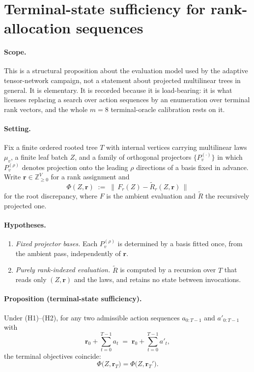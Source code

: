 \section*{Terminal-state sufficiency for rank-allocation sequences}
\label{sec:terminal-state-sufficiency}

\paragraph{Scope.}
This is a structural proposition about the evaluation model used by the
adaptive tensor-network campaign, not a statement about projected multilinear
trees in general. It is elementary. It is recorded because it is load-bearing:
it is what licenses replacing a search over action sequences by an enumeration
over terminal rank vectors, and the whole $m=8$ terminal-oracle calibration
rests on it.

\paragraph{Setting.}
Fix a finite ordered rooted tree $T$ with internal vertices carrying
multilinear laws $\mu_v$, a finite leaf batch $Z$, and a family of orthogonal
projectors $\{P_v^{(\cdot)}\}$ in which $P_v^{(\rho)}$ denotes projection onto
the leading $\rho$ directions of a basis fixed in advance. Write
$\mathbf r \in \mathbb{Z}_{\ge0}^{V}$ for a rank assignment and
\[
  \Phi(Z,\mathbf r) \;:=\; \bigl\|\,F_r(Z) - \widetilde R_r(Z,\mathbf r)\,\bigr\|
\]
for the root discrepancy, where $F$ is the ambient evaluation and
$\widetilde R$ the recursively projected one.

\paragraph{Hypotheses.}
\begin{enumerate}
\item[(H1)] \emph{Fixed projector bases.} Each $P_v^{(\rho)}$ is determined by a
basis fitted once, from the ambient pass, independently of $\mathbf r$.
\item[(H2)] \emph{Purely rank-indexed evaluation.} $\widetilde R$ is computed by
a recursion over $T$ that reads only $(Z, \mathbf r)$ and the laws, and retains
no state between invocations.
\end{enumerate}

\paragraph{Proposition (terminal-state sufficiency).}
Under (H1)--(H2), for any two admissible action sequences
$a_{0:T-1}$ and $a'_{0:T-1}$ with
\[
  \mathbf r_0 + \sum_{t=0}^{T-1} a_t \;=\; \mathbf r_0 + \sum_{t=0}^{T-1} a'_t,
\]
the terminal objectives coincide:
\[
  \boxed{\;\Phi\bigl(Z,\mathbf r_T\bigr) = \Phi\bigl(Z,\mathbf r_T'\bigr).\;}
\]

